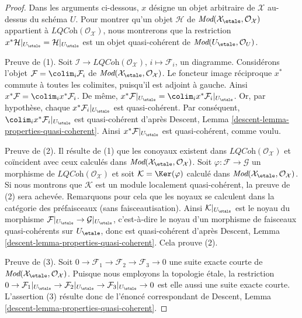 \begin{proof}
Dans les arguments ci-dessous, $x$ désigne un objet arbitraire de $\mathcal{X}$
au-dessus du schéma $U$. Pour montrer qu'un objet $\mathcal{H}$
de $\textit{Mod}(\mathcal{X}_\etale, \mathcal{O}_\mathcal{X})$ appartient
à $\textit{LQCoh}(\mathcal{O}_\mathcal{X})$, nous montrerons que la
restriction $x^*\mathcal{H}|_{U_\etale} = \mathcal{H}|_{U_\etale}$
est un objet quasi-cohérent de $\textit{Mod}(U_\etale, \mathcal{O}_U)$.

\medskip\noindent
Preuve de (1). Soit $\mathcal{I} \to \textit{LQCoh}(\mathcal{O}_\mathcal{X})$,
$i \mapsto \mathcal{F}_i$, un diagramme.
Considérons l'objet $\mathcal{F} = \colim_i \mathcal{F}_i$ de
$\textit{Mod}(\mathcal{X}_\etale, \mathcal{O}_\mathcal{X})$.
Le foncteur image réciproque $x^*$ commute à toutes les colimites,
puisqu'il est adjoint à gauche. Ainsi
$x^*\mathcal{F} = \colim_i x^*\mathcal{F}_i$. De même,
$x^*\mathcal{F}|_{U_\etale} =
\colim_i x^*\mathcal{F}_i|_{U_\etale}$.
Or, par hypothèse, chaque $x^*\mathcal{F}_i|_{U_\etale}$
est quasi-cohérent. Par conséquent, $\colim_i x^*\mathcal{F}_i|_{U_\etale}$
est quasi-cohérent d'après
Descent, Lemma \ref{descent-lemma-properties-quasi-coherent}.
Ainsi $x^*\mathcal{F}|_{U_\etale}$ est quasi-cohérent, comme voulu.

\medskip\noindent
Preuve de (2). Il résulte de (1) que les conoyaux existent dans
$\textit{LQCoh}(\mathcal{O}_\mathcal{X})$ et coïncident avec ceux calculés
dans $\textit{Mod}(\mathcal{X}_\etale, \mathcal{O}_\mathcal{X})$.
Soit $\varphi : \mathcal{F} \to \mathcal{G}$ un morphisme de
$\textit{LQCoh}(\mathcal{O}_\mathcal{X})$ et soit
$\mathcal{K} = \Ker(\varphi)$ calculé dans
$\textit{Mod}(\mathcal{X}_\etale, \mathcal{O}_\mathcal{X})$.
Si nous montrons que $\mathcal{K}$ est un module localement quasi-cohérent,
la preuve de (2) sera achevée. Remarquons pour cela que les noyaux
se calculent dans la catégorie des préfaisceaux (sans faisceautisation).
Ainsi $\mathcal{K}|_{U_\etale}$ est le noyau du morphisme
$\mathcal{F}|_{U_\etale} \to \mathcal{G}|_{U_\etale}$,
c'est-à-dire le noyau d'un morphisme de faisceaux quasi-cohérents sur $U_\etale$,
donc est quasi-cohérent d'après
Descent, Lemma \ref{descent-lemma-properties-quasi-coherent}.
Cela prouve (2).

\medskip\noindent
Preuve de (3). Soit
$0 \to \mathcal{F}_1 \to \mathcal{F}_2 \to \mathcal{F}_3 \to 0$
une suite exacte courte de
$\textit{Mod}(\mathcal{X}_\etale, \mathcal{O}_\mathcal{X})$.
Puisque nous employons la topologie étale, la restriction
$0 \to \mathcal{F}_1|_{U_\etale} \to
\mathcal{F}_2|_{U_\etale} \to \mathcal{F}_3|_{U_\etale} \to 0$
est elle aussi une suite exacte courte. L'assertion (3) résulte donc de l'énoncé
correspondant de
Descent, Lemma \ref{descent-lemma-properties-quasi-coherent}.


\end{proof}
